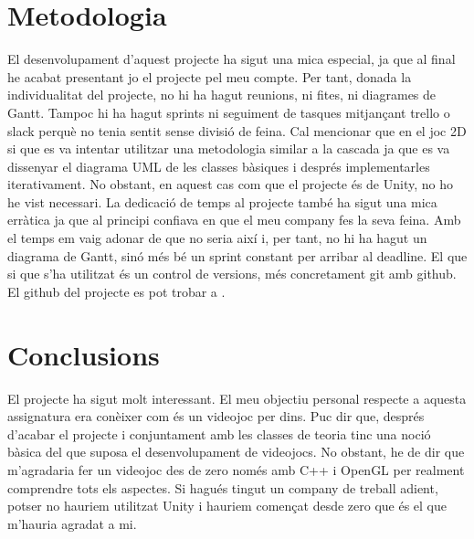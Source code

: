 \documentclass{article}
\begin{document}
\section{Metodologia}
El desenvolupament d'aquest projecte ha sigut una mica especial, ja que
al final he acabat presentant jo el projecte pel meu compte. Per tant,
donada la individualitat del projecte, no hi ha hagut reunions, ni fites, ni
diagrames de Gantt. Tampoc hi ha hagut sprints ni seguiment de
tasques mitjançant trello o slack perquè no tenia sentit sense
divisió de feina. \newline
Cal mencionar que en el joc 2D si que es va intentar utilitzar una metodologia
similar a la cascada ja que es va dissenyar el diagrama UML de les classes
bàsiques i després implementarles iterativament. No obstant, en aquest cas
com que el projecte és de Unity, no ho he vist necessari. \newline
La dedicació de temps al projecte també ha sigut una mica erràtica ja que al principi confiava
en que el meu company fes la seva feina. Amb el temps em vaig adonar de que
no seria així i, per tant, no hi ha hagut un diagrama de Gantt, sinó més bé
un sprint constant per arribar al deadline. El que si que s'ha utilitzat és un control de versions, més concretament git
amb github. El github del projecte es pot trobar a \cite{githubProjecte}.

\section{Conclusions}
El projecte ha sigut molt interessant. El meu objectiu personal respecte a
aquesta assignatura era conèixer com és un videojoc per dins.
Puc dir que, després d'acabar el projecte i conjuntament amb les classes de
teoria tinc una noció bàsica del que suposa el desenvolupament de videojocs.
No obstant, he de dir que m'agradaria fer un videojoc des de zero només
amb C++ i OpenGL per realment comprendre tots els aspectes.
Si hagués tingut un company de treball adient, potser no hauriem utilitzat
Unity i hauriem començat desde zero que és el que m'hauria agradat a mi.



\end{document}
